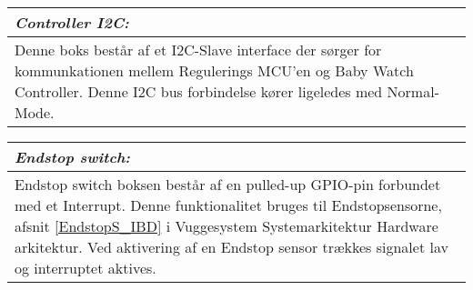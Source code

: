 \begin{center}
    \begin{tabular}{| p{14.5cm} |}
    \hline
    \textit{Controller I2C:} \\ \hline
    Denne boks består af et I2C-Slave interface der sørger for kommunkationen mellem Regulerings MCU'en og Baby Watch Controller. Denne I2C bus forbindelse kører ligeledes med Normal-Mode. \\ \hline
    \end{tabular}
\end{center}

\begin{center}
    \begin{tabular}{| p{14.5cm} |}
    \hline
    \textit{Endstop switch:} \\ \hline
   Endstop switch boksen består af en pulled-up GPIO-pin forbundet med et Interrupt. Denne funktionalitet bruges til Endstopsensorne, afsnit \vref{EndstopS_IBD} i Vuggesystem Systemarkitektur Hardware arkitektur. Ved aktivering af en Endstop sensor trækkes signalet lav og interruptet aktives. \\ \hline
    \end{tabular}
\end{center}

